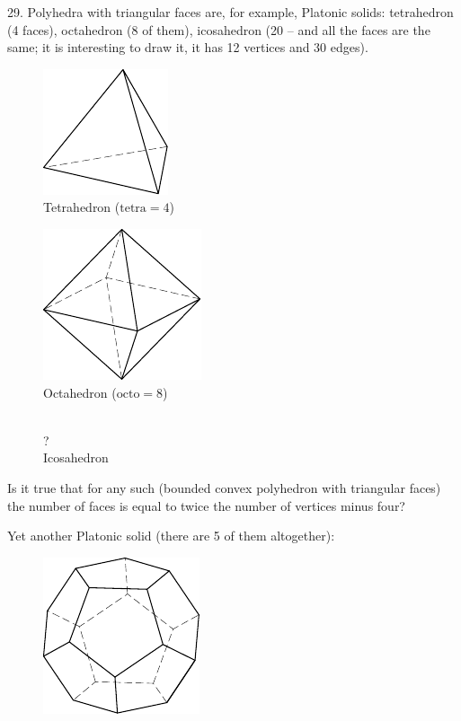 \begin{problem}{29.}
	Polyhedra with triangular faces are, for example, Platonic solids: tetrahedron (4 faces),
	octahedron (8 of them), icosahedron (20 -- and all the faces are the same; it is interesting to draw it,
	it has 12 vertices and 30 edges).
	\begin{figure}
		\footnotesize
		\null\hfill
		\parbox{0.3\linewidth}{\centering\includegraphics{taskbook-131}\\Tetrahedron ($\text{tetra}= 4$)}
		\hfill
		\parbox{0.3\linewidth}{\centering\includegraphics{taskbook-132}\\Octahedron ($\text{octo}= 8$)}
		\hfill\null\\
		{\Huge ?}\\Icosahedron
	\end{figure}
	Is it true that for any such (bounded convex polyhedron with triangular faces) the number of faces is
	equal to twice the number of vertices minus four?


	Yet another Platonic solid (there are 5 of them altogether):
	\begin{figure}
		\includegraphics{taskbook-14}
	\end{figure}
\end{problem}

